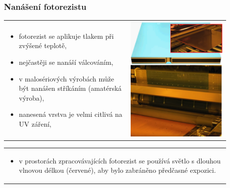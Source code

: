 \documentclass{beamer}
\begin{document}
\begin{frame}
	\frametitle{Nanášení fotorezistu}

	\begin{flushleft}
		\begin{tabular}{m{0.5\linewidth} m{0.4\linewidth}}
		\begin{itemize}
			\item fotorezist se aplikuje tlakem při zvýšené teplotě,
			\item nejčastěji se nanáší válcováním,
			\item v malosériových výrobách může být nanášen stříkáním (amatérská výroba),
			\item nanesená vrstva je velmi citlivá na UV záření,
		\end{itemize}
		 & \includegraphics[scale=0.12]{jadroFotofilm.png}
		\end{tabular}
		\begin{tabular}{m{0.9\linewidth}}
		\begin{itemize}
			\item v prostorách zpracovávajících fotorezist se používá světlo s dlouhou vlnovou délkou (červené), aby bylo zabráněno předčasné expozici.
		\end{itemize}
		\end{tabular}
	\end{flushleft}

\end{frame}
\end{document}
